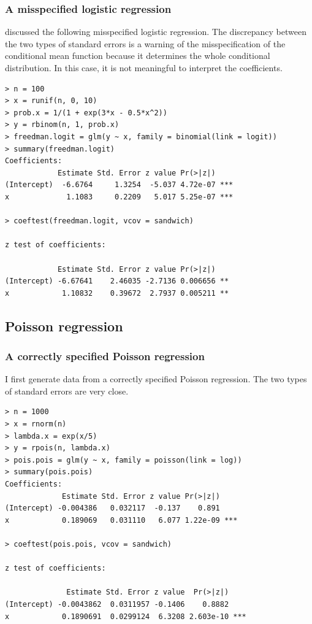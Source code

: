\subsubsection{A misspecified logistic regression}

\citet{freedman2006so} discussed the following misspecified logistic regression. The discrepancy between the two types of standard errors is a warning of the misspecification of the conditional mean function because it determines the whole conditional distribution. In this case, it is not meaningful to interpret the coefficients. 

\begin{lstlisting}
> n = 100
> x = runif(n, 0, 10)
> prob.x = 1/(1 + exp(3*x - 0.5*x^2))
> y = rbinom(n, 1, prob.x)
> freedman.logit = glm(y ~ x, family = binomial(link = logit))
> summary(freedman.logit)
Coefficients:
            Estimate Std. Error z value Pr(>|z|)    
(Intercept)  -6.6764     1.3254  -5.037 4.72e-07 ***
x             1.1083     0.2209   5.017 5.25e-07 ***

> coeftest(freedman.logit, vcov = sandwich)

z test of coefficients:

            Estimate Std. Error z value Pr(>|z|)   
(Intercept) -6.67641    2.46035 -2.7136 0.006656 **
x            1.10832    0.39672  2.7937 0.005211 **
\end{lstlisting}



\subsection{Poisson regression}

\subsubsection{A correctly specified Poisson regression}

I first generate data from a correctly specified Poisson regression. The two types of standard errors are very close.

\begin{lstlisting}
> n = 1000
> x = rnorm(n)
> lambda.x = exp(x/5)
> y = rpois(n, lambda.x)
> pois.pois = glm(y ~ x, family = poisson(link = log))
> summary(pois.pois)
Coefficients:
             Estimate Std. Error z value Pr(>|z|)    
(Intercept) -0.004386   0.032117  -0.137    0.891    
x            0.189069   0.031110   6.077 1.22e-09 ***

> coeftest(pois.pois, vcov = sandwich)

z test of coefficients:

              Estimate Std. Error z value  Pr(>|z|)    
(Intercept) -0.0043862  0.0311957 -0.1406    0.8882    
x            0.1890691  0.0299124  6.3208 2.603e-10 ***
\end{lstlisting}


